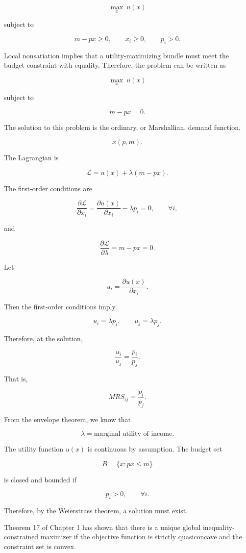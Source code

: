 \[
\max_{x} \ u(x)
\]

subject to

\[
m - px \ge 0,
\qquad
x_i \ge 0,
\qquad
p_i > 0.
\]

Local nonsatiation implies that a utility-maximizing bundle must meet the budget constraint with equality. Therefore, the problem can be written as

\[
\max_{x} \ u(x)
\]

subject to

\[
m - px = 0.
\]

The solution to this problem is the ordinary, or Marshallian, demand function,

\[
x(p,m).
\]

The Lagrangian is

\[
\mathcal{L}
=
u(x) + \lambda(m-px).
\]

The first-order conditions are

\[
\frac{\partial \mathcal{L}}{\partial x_i}
=
\frac{\partial u(x)}{\partial x_i}
-
\lambda p_i
=
0,
\qquad
\forall i,
\]

and

\[
\frac{\partial \mathcal{L}}{\partial \lambda}
=
m-px
=
0.
\]

Let

\[
u_i
=
\frac{\partial u(x)}{\partial x_i}.
\]

Then the first-order conditions imply

\[
u_i = \lambda p_i,
\qquad
u_j = \lambda p_j.
\]

Therefore, at the solution,

\[
\frac{u_i}{u_j}
=
\frac{p_i}{p_j}.
\]

That is,

\[
MRS_{ij}
=
\frac{p_i}{p_j}.
\]

From the envelope theorem, we know that

\[
\lambda
=
\text{marginal utility of income}.
\]

The utility function \(u(x)\) is continuous by assumption. The budget set

\[
B
=
\{x : px \le m\}
\]

is closed and bounded if

\[
p_i > 0,
\qquad
\forall i.
\]

Therefore, by the Weierstrass theorem, a solution must exist.

Theorem 17 of Chapter 1 has shown that there is a unique global inequality-constrained maximizer if the objective function is strictly quasiconcave and the constraint set is convex.

